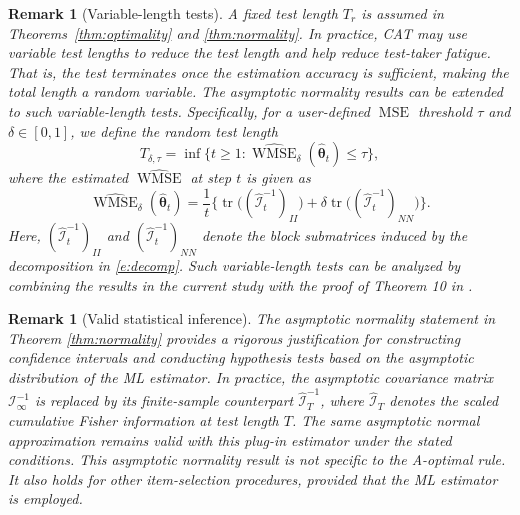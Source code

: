 \documentclass[12pt]{article}
\newcommand{\bftheta}{\boldsymbol{\theta}}
\newtheorem{remark}[theorem]{Remark}
\begin{document}
\begin{remark}[Variable-length tests]
\label{rem:variable}
A fixed test length $T_r$ is assumed in Theorems~\ref{thm:optimality} and \ref{thm:normality}. In practice, CAT may use variable test lengths to reduce the test length and help reduce test-taker fatigue. That is, the test terminates once the estimation accuracy is sufficient, making the total length a random variable. The asymptotic normality results can be extended to such variable-length tests. Specifically, for a user-defined $\operatorname{MSE}$ threshold $\tau$ and $\delta \in [0,1]$, we define the random test length
\begin{equation*}
T_{\delta, \tau} = \inf \{ t \geq 1: \widehat{\operatorname{WMSE}}_{\delta}(\hat{\bftheta}_t) \leq \tau \},
\end{equation*}
where the estimated $\widehat{\operatorname{WMSE}}$ at step $t$ is given as 
\begin{equation*}
\widehat{\operatorname{WMSE}}_{\delta}(\hat{\bftheta}_t) = \frac{1}{t} \Big\{ \operatorname{tr} \Big( (\hat{\mathcal{I}}_t^{-1})_{II} \Big) + \delta \operatorname{tr}\Big( (\hat{\mathcal{I}}_t^{-1})_{NN} \Big) \Big\}.
\end{equation*}
Here, $(\hat{\mathcal I}_t^{-1})_{II}$ and $(\hat{\mathcal I}_t^{-1})_{NN}$ denote the block submatrices induced by the decomposition in \eqref{e:decomp}. Such variable-length tests can be analyzed by combining the results in the current study with the proof of Theorem 10 in .
\end{remark}

\begin{remark}[Valid statistical inference]
The asymptotic normality statement in Theorem \ref{thm:normality} provides a rigorous justification for constructing confidence intervals and conducting hypothesis tests based on the asymptotic distribution of the ML estimator. In practice, the asymptotic covariance matrix $\mathcal{I}_{\infty}^{-1}$ is replaced by its finite-sample counterpart $\hat{\mathcal{I}}_T^{-1}$, where $\hat{\mathcal{I}}_T$ denotes the scaled cumulative Fisher information at test length $T$. The same asymptotic normal approximation remains valid with this plug-in estimator under the stated conditions.
This asymptotic normality result is not specific to the A-optimal rule. It also holds for other item-selection procedures, provided that the ML estimator is employed.
\end{remark}
\end{document}
